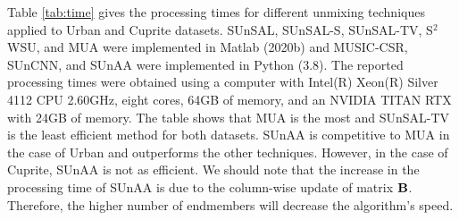 Table \ref{tab:time} gives the processing times for different unmixing techniques applied to Urban and Cuprite datasets. SUnSAL, SUnSAL-S, SUnSAL-TV, S$^2$WSU,  and MUA were implemented in Matlab (2020b) and MUSIC-CSR, SUnCNN, and SUnAA were implemented in Python (3.8). The reported processing times were obtained using a computer with Intel(R) Xeon(R) Silver 4112 CPU  2.60GHz, eight cores, 64GB of memory, and an NVIDIA TITAN RTX with 24GB of memory.  The table shows that MUA is the most and SUnSAL-TV is the least efficient method for both datasets. SUnAA is competitive to MUA in the case of Urban and outperforms the other techniques. However, in the case of Cuprite, SUnAA is not as efficient. We should note that the increase in the processing time of SUnAA is due to the column-wise update of matrix ${\bf B}$. Therefore, the higher number of endmembers will decrease the algorithm's speed. 


\begin{table}[h]
\centering
\caption{Processing times of different sparse unmixing techniques applied to real datasets.}
	\label{tab:time}
\end{table}